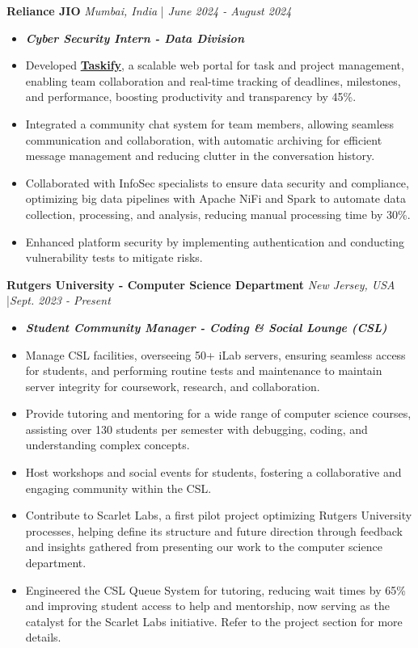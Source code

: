 \documentclass[a4paper]{article}
\begin{document}
\textbf{Reliance JIO} \hfill  \textit{Mumbai, India} | \textit{June 2024 - August 2024}
\vspace{-2.5mm}
\begin{itemize} \itemsep -4pt \item[] \textit{\textbf{Cyber Security Intern - Data Division}}
\item Developed \textbf{\href{https://github.com/ShatakshiRanjan/JIOWebDesign}{Taskify}}, a scalable web portal for task and project management, enabling team collaboration and real-time tracking of deadlines, milestones, and performance, boosting productivity and transparency by 45\%.
\item Integrated a community chat system for team members, allowing seamless communication and collaboration, with automatic archiving for efficient message management and reducing clutter in the conversation history.
\item Collaborated with InfoSec specialists to ensure data security and compliance, optimizing big data pipelines with Apache NiFi and Spark to automate data collection, processing, and analysis, reducing manual processing time by 30\%.
\item Enhanced platform security by implementing authentication and conducting vulnerability tests to mitigate risks.
\end{itemize}
\vspace{-2mm}
\textbf{Rutgers University - Computer Science Department} \hfill \textit{New Jersey, USA} |\textit{Sept. 2023 - Present}
\vspace{-2.5mm}
\begin{itemize} \itemsep -4pt
    \item[] \textit{\textbf{Student Community Manager - Coding \& Social Lounge (CSL)}}
    \item Manage CSL facilities, overseeing 50+ iLab servers, ensuring seamless access for students, and performing routine tests and maintenance to maintain server integrity for coursework, research, and collaboration.
    \item Provide tutoring and mentoring for a wide range of computer science courses, assisting over 130 students per semester with debugging, coding, and understanding complex concepts. 
    \item Host workshops and social events for students, fostering a collaborative and engaging community within the CSL.
    \item Contribute to Scarlet Labs, a first pilot project optimizing Rutgers University processes, helping define its structure and future direction through feedback and insights gathered from presenting our work to the computer science department.
    \item Engineered the CSL Queue System for tutoring, reducing wait times by 65\% and improving student access to help and mentorship, now serving as the catalyst for the Scarlet Labs initiative. Refer to the project section for more details. 
\end{itemize}
\end{document}
